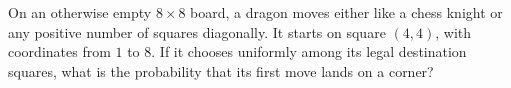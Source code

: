 On an otherwise empty $8\times8$ board, a dragon moves either like a chess knight or any positive number of squares diagonally. It starts on square $(4,4)$, with coordinates from $1$ to $8$. If it chooses uniformly among its legal destination squares, what is the probability that its first move lands on a corner?
